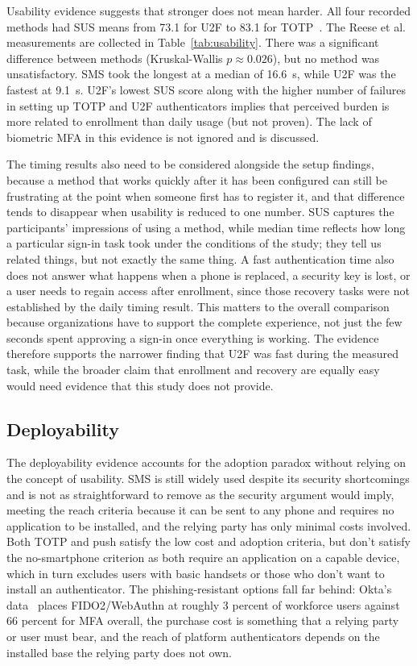 \documentclass[sigconf]{acmart}
\begin{document}
Usability evidence suggests that stronger does not mean harder. All four recorded methods had SUS means from 73.1 for U2F to 83.1
for TOTP~\cite{reese:2019:2fa}. The Reese et al.~\cite{reese:2019:2fa} measurements are collected in Table~\ref{tab:usability}. There was a significant difference
between methods (Kruskal-Wallis $p \approx 0.026$), but no method was
unsatisfactory. SMS took the longest at a median of 16.6~s, while U2F was the fastest at 9.1~s. U2F's lowest SUS score along
with the higher number of failures in setting up TOTP and U2F
authenticators implies that perceived burden is more related to
enrollment than daily usage (but not proven). The lack of biometric MFA in this evidence is not ignored and is discussed.

The timing results also need to be considered alongside the setup findings, because a method that works quickly after it has been configured can still be frustrating at the point when someone first has to register it, and that difference tends to disappear when usability is reduced to one number. SUS captures the participants' impressions of using a method, while median time reflects how long a particular sign-in task took under the conditions of the study; they tell us related things, but not exactly the same thing. A fast authentication time also does not answer what happens when a phone is replaced, a security key is lost, or a user needs to regain access after enrollment, since those recovery tasks were not established by the daily timing result. This matters to the overall comparison because organizations have to support the complete experience, not just the few seconds spent approving a sign-in once everything is working. The evidence therefore supports the narrower finding that U2F was fast during the measured task, while the broader claim that enrollment and recovery are equally easy would need evidence that this study does not provide.

\subsection{Deployability}

The deployability evidence accounts for the adoption paradox without relying on the concept of
usability. SMS is still widely used despite its security shortcomings and is not as
straightforward to remove as the security argument would imply, meeting the reach criteria because
it can be sent to any phone and requires no application to be installed, and the relying party has
only minimal costs involved. Both TOTP and push satisfy the low cost and adoption criteria, but
don't satisfy the no-smartphone criterion as both require an application on a capable device, which
in turn excludes users with basic handsets or those who don't want to install an authenticator. The
phishing-resistant options fall far behind: Okta's data~\cite{okta:2024:signin} places FIDO2/WebAuthn at roughly 3 percent of workforce users against 66 percent for MFA overall, the purchase
cost is something that a relying party or user must bear, and the reach of platform authenticators
depends on the installed base the relying party does not own.
\end{document}

